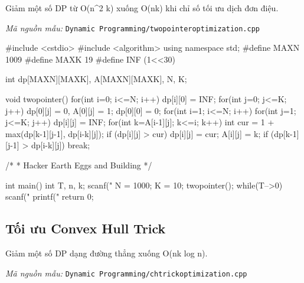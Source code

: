 \documentclass[11pt]{article}
\newcommand{\codepath}[1]{\par\noindent\textit{Mã nguồn mẫu:} \texttt{#1}\par}
\begin{document}
Giảm một số DP từ O(n\textasciicircum{}2 k) xuống O(nk) khi chỉ số tối ưu dịch đơn điệu.

\codepath{Dynamic Programming/twopointeroptimization.cpp}

\begingroup\scriptsize
\begin{vncode}
#include <cstdio>
#include <algorithm>
using namespace std;
#define MAXN 1009
#define MAXK 19
#define INF (1<<30)

int dp[MAXN][MAXK], A[MAXN][MAXK], N, K;

void twopointer() {
	for(int i=0; i<=N; i++) dp[i][0] = INF;
	for(int j=0; j<=K; j++) dp[0][j] = 0, A[0][j] = 1;
	dp[0][0] = 0;
	for(int i=1; i<=N; i++) {
		for(int j=1; j<=K; j++) {
			dp[i][j] = INF;
			for(int k=A[i-1][j]; k<=i; k++) {
				int cur = 1 + max(dp[k-1][j-1], dp[i-k][j]);
				if (dp[i][j] > cur) {
					dp[i][j] = cur;
					A[i][j] = k;
				}
				if (dp[k-1][j-1] > dp[i-k][j]) break;
			}
		}
	}
}

/*
 *	Hacker Earth Eggs and Building
 */

int main() {
	int T, n, k;
	scanf("%
	N = 1000;
	K = 10;
	twopointer();
	while(T-->0) {
		scanf("%
		printf("%
	}
	return 0;
}
\end{vncode}
\endgroup


\subsection{Tối ưu Convex Hull Trick}

Giảm một số DP dạng đường thẳng xuống O(nk log n).

\codepath{Dynamic Programming/chtrickoptimization.cpp}
\end{document}
